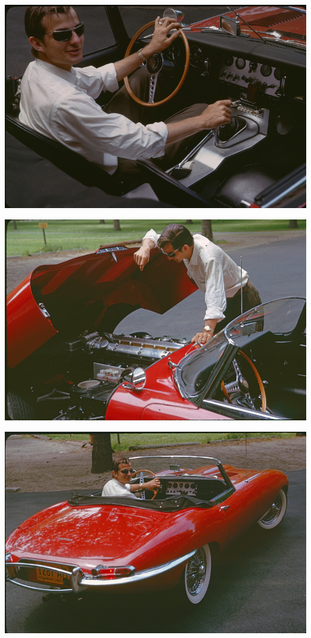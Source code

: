 \documentclass[preprintnumbers,12pt]{revtex4-2}
\begin{document}
\begin{flushleft}
  \includegraphics[scale=25.1]{shift.jpg}
\end{flushleft}

\begin{center}
  \includegraphics[scale=25.1]{hood.jpg}
\end{center}

\begin{flushright}
  \includegraphics[scale=25.1]{byebye.jpg}
\end{flushright}
\end{document}
